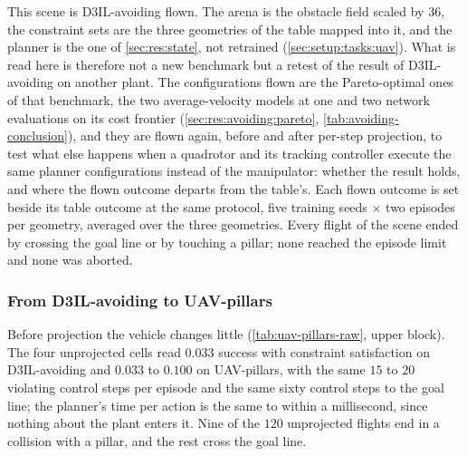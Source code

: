 This scene is D3IL-avoiding flown. The arena is the obstacle field scaled by $36$, the constraint sets are
the three geometries of the table mapped into it, and the planner is the one of \autoref{sec:res:state},
not retrained (\autoref{sec:setup:tasks:uav}). What is read here is therefore not a new benchmark but a
retest of the result of D3IL-avoiding on another plant. The configurations flown are the Pareto-optimal ones
of that benchmark, the two average-velocity models at one and two network evaluations on its cost frontier
(\autoref{sec:res:avoiding:pareto}, \autoref{tab:avoiding-conclusion}), and they are flown again, before and
after per-step projection, to test what else happens when a quadrotor and its tracking controller execute the
same planner configurations instead of the manipulator: whether the result holds, and where the flown outcome departs from the
table's. Each flown outcome is set beside its table outcome at the same protocol, five training seeds $\times$
two episodes per geometry, averaged over the three geometries. Every flight of the scene ended by crossing the goal line
or by touching a pillar; none reached the episode limit and none was aborted.

\subsubsection{From D3IL-avoiding to UAV-pillars}\label{sec:res:uav:models}

Before projection the vehicle changes little (\autoref{tab:uav-pillars-raw}, upper block). The four
unprojected cells read $0.033$ success with constraint satisfaction on D3IL-avoiding and $0.033$ to
$0.100$ on UAV-pillars, with the same $15$ to $20$ violating control steps per episode and the same sixty
control steps to the goal line; the planner's time per action is the same to within a millisecond, since
nothing about the plant enters it. Nine of the $120$ unprojected flights end in a collision with a pillar,
and the rest cross the goal line.

